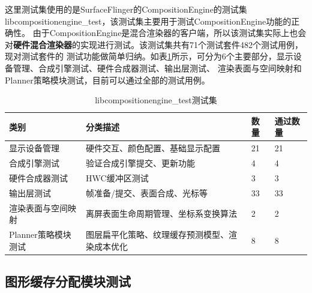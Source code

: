 这里测试集使用的是SurfaceFlinger的CompositionEngine的测试集libcompositionengine\_test，该测试集主要用于测试CompositionEngine功能的正确性。
由于CompositionEngine是混合渲染器的客户端，所以该测试集实际上也会对\textbf{硬件混合渲染器}的实现进行测试。该测试集共有71个测试套件482个测试用例，现对测试套件的
测试功能做简单归纳。如表\ref{tab:libcompositionengine_test测试集}所示，可分为6个主要部分，显示设备管理、合成引擎测试、硬件合成器测试、输出层测试、
渲染表面与空间映射和Planner策略模块测试，目前可以通过全部的测试用例。

\begin{table}[H]
    \centering
    \caption{libcompositionengine\_test测试集}
    \label{tab:libcompositionengine_test测试集}
    \begin{tabular}{lp{3cm}ll}
      \toprule
      类别 &  分类描述 & 数量 & 通过数量\\
      \midrule
      显示设备管理 & 硬件交互、颜色配置、基础显示配置 & 21 & 21\\
      合成引擎测试 & 验证合成引擎提交、更新功能 & 4 & 4\\
      硬件合成器测试 & HWC缓冲区测试 & 3 & 3\\
      输出层测试 & 帧准备/提交、表面合成、光标等  & 33 & 33\\
      渲染表面与空间映射 & 	离屏表面生命周期管理、坐标系变换算法 & 2 & 2\\
      Planner策略模块测试 & 图层扁平化策略、纹理缓存预测模型、渲染成本优化 & 8 & 8\\
      \bottomrule
    \end{tabular}
    \note{}
\end{table}



\subsection{图形缓存分配模块测试}



